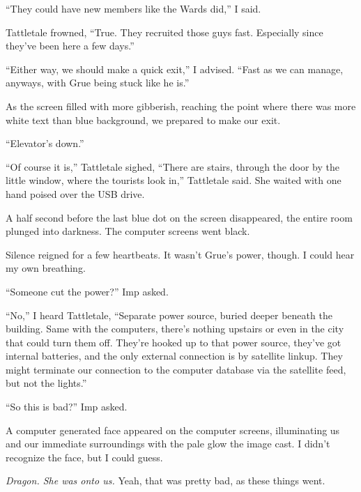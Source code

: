 ``They could have new members like the Wards did,'' I said.



Tattletale frowned, ``True.  They recruited those guys fast.  Especially since they've been here a few days.''



``Either way, we should make a quick exit,'' I advised.  ``Fast as we can manage, anyways, with Grue being stuck like he is.''



As the screen filled with more gibberish, reaching the point where there was more white text than blue background, we prepared to make our exit.



``Elevator's down.''



``Of course it is,'' Tattletale sighed, ``There are stairs, through the door by the little window, where the tourists look in,'' Tattletale said.  She waited with one hand poised over the USB drive.



A half second before the last blue dot on the screen disappeared, the entire room plunged into darkness.  The computer screens went black.



Silence reigned for a few heartbeats.  It wasn't Grue's power, though.  I could hear my own breathing.



``Someone cut the power?'' Imp asked.



``No,'' I heard Tattletale, ``Separate power source, buried deeper beneath the building.  Same with the computers, there's nothing upstairs or even in the city that could turn them off.  They're hooked up to that power source, they've got internal batteries, and the only external connection is by satellite linkup.  They might terminate our connection to the computer database via the satellite feed, but not the lights.''



``So this is bad?'' Imp asked.



A computer generated face appeared on the computer screens, illuminating us and our immediate surroundings with the pale glow the image cast.  I didn't recognize the face, but I could guess.



\emph{Dragon.  She was onto us.}  Yeah, that was pretty bad, as these things went.





